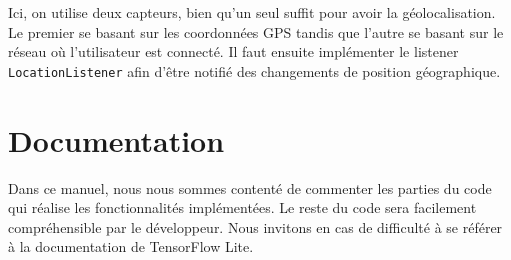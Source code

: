 \documentclass[UTF8]{EPURapport}
\begin{document}
Ici, on utilise deux capteurs, bien qu'un seul suffit pour avoir la géolocalisation. Le premier se basant sur les coordonnées GPS tandis que l'autre se basant sur le réseau où l'utilisateur est connecté. Il faut ensuite implémenter le listener \verb|LocationListener| afin d'être notifié des changements de position géographique.\\

\chapter{Documentation}

Dans ce manuel, nous nous sommes contenté de commenter les parties du code qui réalise les fonctionnalités implémentées. Le reste du code sera facilement compréhensible par le développeur. Nous invitons en cas de difficulté à se référer à la documentation de TensorFlow Lite.
\end{document}
